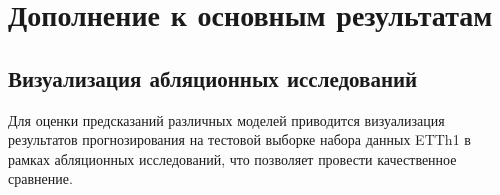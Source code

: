 \section{Дополнение к основным результатам}

\subsection{Визуализация абляционных исследований}


Для оценки предсказаний различных моделей приводится визуализация результатов 
прогнозирования на тестовой выборке набора данных ETTh1 в рамках абляционных исследований, 
что позволяет провести качественное сравнение.


